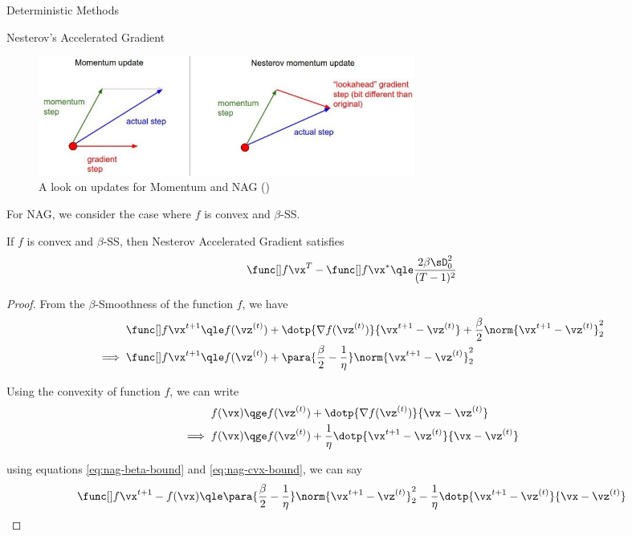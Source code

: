 \documentclass{article}
\begin{document}
\begin{psection}{Deterministic Methods}
\begin{psubsection}{Nesterov's Accelerated Gradient}
	\begin{figure}[h]
		\centering
		\includegraphics[width=0.6\textwidth]{includes/nag-vs-mom.jpeg}
		\caption{A look on updates for Momentum and NAG \quad ()}
		\label{fig:nag-vs-mom}
	\end{figure}

	For NAG, we consider the case where $f$ is convex and $\beta$-SS.

	\begin{theorem}
		\label{th:nag}
		If $f$ is convex and $\beta$-SS, then Nesterov Accelerated Gradient satisfies
		\begin{equation}
			\f{T} - \fs	\qle	\frac{2 \beta \sD_0^2}{(T - 1)^2}
			\label{eq:nag}
		\end{equation}

		\begin{proof}
			From the $\beta$-Smoothness of the function $f$, we have
			\begin{align}
				\f{t+1}	&\qle	\fz{t} + \dotp{\gfz{t}}{\x{t+1} - \z{t}} + \frac{\beta}{2} \norm{\x{t+1} - \z{t}}_2^2 \nonumber \\
				\implies \f{t+1}	&\qle	\fz{t} + \para{\frac{\beta}{2} - \frac{1}{\eta}} \norm{\x{t + 1} - \z{t}}_2^2 \label{eq:nag-beta-bound}
			\end{align}

			Using the convexity of function $f$, we can write
			\begin{align}
				f(\vx)	&\qge	\fz{t} + \dotp{\gfz{t}}{\vx - \z{t}} \nonumber \\
				\implies f(\vx)	&\qge	\fz{t} + \frac{1}{\eta} \dotp{\x{t+1} - \z{t}}{\vx - \z{t}} \label{eq:nag-cvx-bound}
			\end{align}

			using equations \ref{eq:nag-beta-bound} and \ref{eq:nag-cvx-bound}, we can say
			\begin{align}
				\f{t + 1} - f(\vx)	\qle	\para{\frac{\beta}{2} - \frac{1}{\eta}} \norm{\x{t + 1} - \z{t}}_2^2 - \frac{1}{\eta} \dotp{\x{t+1} - \z{t}}{\vx - \z{t}}
				\label{eq:nag-diff-bound}
			\end{align}


\end{proof}
\end{theorem}
\end{psubsection}
\end{psection}
\end{document}
